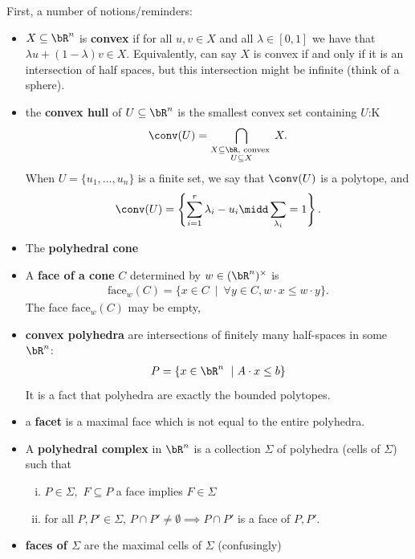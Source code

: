 First, a number of notions/reminders:
\begin{itemize}
  \item $X \subseteq \bR^n$ is \textbf{convex} if for all $u,v \in X$ and all $\lambda \in [0,1]$ we have that $\lambda u + (1 - \lambda)v \in X$. Equivalently, can say $X$ is convex if and only if it is an intersection of half spaces, but this intersection might be infinite (think of a sphere).
  \item the \textbf{convex hull} of $U \subseteq \bR^n$ is the smallest convex set containing $U$:K
    \begin{align*}
      \conv(U) = \bigcap_{\substack{X\subseteq \bR, \text{ convex } \\ U \subseteq X}} X.
    \end{align*}
    When $U = \{u_1,...,u_n\}$ is a finite set, we say that $\conv(U)$ is a polytope, and
    \begin{align*}
      \conv(U) = \left\{\sum_{i=1}^r \lambda_i - u_i \midd \sum_{\lambda_i} = 1\right\}.
    \end{align*}
  \item The \textbf{polyhedral cone}
  \item A \textbf{face of a cone} $C$ determined by $w \in (\bR^n)^\times$ is
    \begin{align*}
      \text{face}_w(C) = \{x \in C ~\mid ~ \forall y\in C, w \cdot x \leq w \cdot y\}.
    \end{align*}
    The face $\text{face}_w(C)$ may be empty,
  \item \textbf{convex polyhedra} are intersections of finitely many half-spaces in some $\bR^n$:
    \begin{align*}
      P = \{x \in \bR^n ~\mid A\cdot x \leq b\}
    \end{align*}
    It is a fact that polyhedra are exactly the bounded polytopes.
  \item a \textbf{facet} is a maximal face which is not equal to the entire polyhedra.
  \item A \textbf{polyhedral complex} in $\bR^n$ is a collection $\Sigma$ of polyhedra (cells of $\Sigma$) such that 
    \begin{enumerate}[(i)]
      \item $P \in \Sigma, $ $F \subseteq P$ a face implies $F \in \Sigma$
      \item for all $P,P' \in \Sigma$, $P\cap P' \neq \emptyset \implies P\cap P'$ is a face of $P,P'$.
    \end{enumerate}
  \item \textbf{faces of $\Sigma$} are the maximal cells of $\Sigma$ (confusingly)

\end{itemize}
